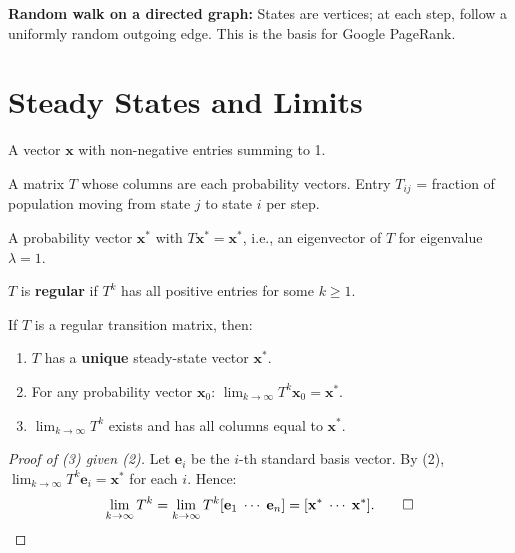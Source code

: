 \textbf{Random walk on a directed graph:} States are vertices; at each step, follow a uniformly random outgoing edge. This is the basis for Google PageRank.

\section{Steady States and Limits}

\begin{definition}
A vector $\mathbf{x}$ with non-negative entries summing to 1.
\end{definition}

\begin{definition}
A matrix $T$ whose columns are each probability vectors. Entry $T_{ij}$ = fraction of population moving from state $j$ to state $i$ per step.
\end{definition}

\begin{definition}
A probability vector $\mathbf{x}^*$ with $T\mathbf{x}^*=\mathbf{x}^*$, i.e., an eigenvector of $T$ for eigenvalue $\lambda=1$.
\end{definition}

\begin{definition}
$T$ is \textbf{regular} if $T^k$ has all positive entries for some $k\geq1$.
\end{definition}

\begin{theorem}\label{thm:markov-convergence}
If $T$ is a regular transition matrix, then:
\begin{enumerate}
  \item $T$ has a \textbf{unique} steady-state vector $\mathbf{x}^*$.
  \item For any probability vector $\mathbf{x}_0$: $\lim_{k\to\infty}T^k\mathbf{x}_0=\mathbf{x}^*$.
  \item $\lim_{k\to\infty}T^k$ exists and has all columns equal to $\mathbf{x}^*$.
\end{enumerate}
\end{theorem}

\begin{proof}[Proof of (3) given (2)]
Let $\mathbf{e}_i$ be the $i$-th standard basis vector. By (2), $\lim_{k\to\infty}T^k\mathbf{e}_i=\mathbf{x}^*$ for each $i$. Hence:
\[
\lim_{k\to\infty}T^k = \lim_{k\to\infty}T^k[\mathbf{e}_1\;\cdots\;\mathbf{e}_n] = [\mathbf{x}^*\;\cdots\;\mathbf{x}^*]. \qed
\]
\end{proof}

